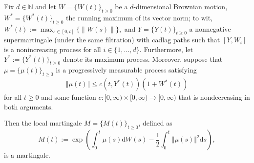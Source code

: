 \begin{theorem}
\label{P:Benes} Fix $d \in\mathbb{N}$ and let $W=\{W\left( t\right)
\}_{t\geq0}$ be a $d$-dimensional Brownian motion, $W^{*}=\{W^{*}\left(
t\right) \}_{t\geq0}$ the running maximum of its vector norm; to wit, $%
W^{*}(t) := \max_{s \in[0,t]} \{\|W(s)\|\}, $ and $Y=\{Y\left( t\right)
\}_{t\geq0}$ a nonnegative supermartingale (under the same filtration) with
cadlag paths such that $[Y,W_i]$ is a nonincreasing process for all $i \in
\{1, \ldots, d\}$. Furthermore, let $Y^{*} := \{Y^{*}\left( t\right)
\}_{t\geq0}$ denote its maximum process. Moreover, suppose that $%
\mu=\{\mu\left( t\right) \}_{t\geq0}$ is a progressively measurable process
satisfying
\begin{align*} %
\left\Vert \mu(t) \right\Vert\leq c(t, Y^*(t))\left( 1+ W^{*}(t)\right)
\end{align*}
for all $t \geq 0$ and some function $c:[0,\infty) \times [0,\infty)
\rightarrow [0,\infty)$ that is nondecreasing in both arguments.

Then the local martingale $M=\{M\left( t\right) \}_{t\geq0}$, defined as
\begin{equation*}
M( t) :=\exp\left( \int_{0}^{t}\mu( s ) \mathrm{d} W(s) -\frac{1}{2}%
\int_{0}^{t}\left\Vert \mu( s) \right\Vert^{2}\mathrm{d}s\right) ,
\end{equation*}
is a martingale.
\end{theorem}

